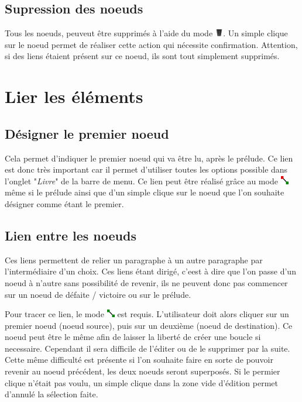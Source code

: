 		\subsection{Supression des noeuds}

			Tous les noeuds, peuveut être supprimés à l'aide du mode \includegraphics[height=10pt, keepaspectratio]{img/icons/delete.png}. Un simple clique sur le noeud permet de réaliser cette action qui nécessite confirmation. Attention, si des liens étaient présent sur ce noeud, ils sont tout simplement supprimés.

	\section{Lier les éléments}
		\label{sec:lien}

		\subsection{Désigner le premier noeud}

			Cela permet d'indiquer le premier noeud qui va être lu, après le prélude. Ce lien est donc très important car il permet d'utiliser toutes les options possible dans l'onglet "\textit{Livre}" de la barre de menu. Ce lien peut être réalisé grâce au mode \includegraphics[height=10pt, keepaspectratio]{img/icons/first_node.png} même si le prélude ainsi que d'un simple clique sur le noeud que l'on souhaite désigner comme étant le premier.

		\subsection{Lien entre les noeuds}

			Ces liens permettent de relier un paragraphe à un autre paragraphe par l'intermédiaire d'un choix. Ces liens étant dirigé, c'eest à dire que l'on passe d'un noeud à n'autre sans possibilité de revenir, ils ne peuvent donc pas commencer sur un noeud de défaite / victoire ou sur le prélude.

			Pour tracer ce lien, le mode \includegraphics[height=10pt, keepaspectratio]{img/icons/add_link.png} est requis. L'utilisateur doit alors cliquer sur un premier noeud (noeud source), puis sur un deuxième (noeud de destination). Ce noeud peut être le même afin de laisser la liberté de créer une boucle si necessaire. Cependant il sera difficile de l'éditer ou de le supprimer par la suite. Cette même difficulté est présente si l'on souhaite faire en sorte de pouvoir revenir au noeud précédent, les deux noeuds seront superposés. Si le permier clique n'était pas voulu, un simple clique dans la zone vide d'édition permet d'annulé la sélection faite.

